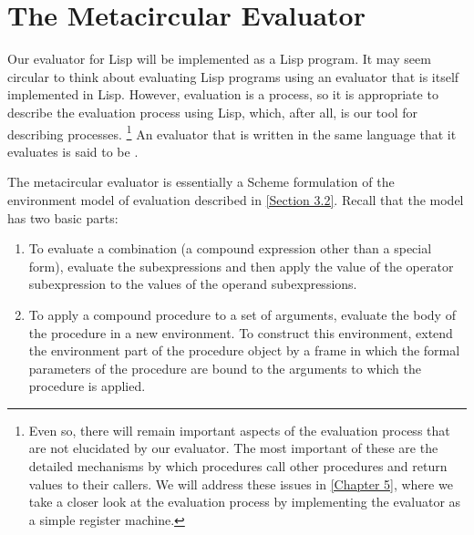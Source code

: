 \section{The Metacircular Evaluator}
\label{Section 4.1}

Our evaluator for Lisp will be implemented as a Lisp program.
It may seem circular to think about evaluating Lisp programs using an evaluator that is itself implemented in Lisp.
However, evaluation is a process, so it is appropriate to describe the evaluation process using Lisp, which, after all, is our tool for describing processes.%
\footnote{
	Even so, there will remain important aspects of the evaluation process that are not elucidated by our evaluator.
	The most important of these are the detailed mechanisms by which procedures call other procedures and return values to their callers.
	We will address these issues in \cref{Chapter 5}, where we take a closer look at the evaluation process by implementing the evaluator as a simple register machine.
}
An evaluator that is written in the same language that it evaluates is said to be .

The metacircular evaluator is essentially a Scheme formulation of the environment model of evaluation described in \cref{Section 3.2}.
Recall that the model has two basic parts:
\begin{enumerate}

	\item
		To evaluate a combination (a compound expression other than a special form), evaluate the subexpressions and then apply the value of the operator subexpression to the values of the operand subexpressions.

	\item
		To apply a compound procedure to a set of arguments, evaluate the body of the procedure in a new environment.
		To construct this environment, extend the environment part of the procedure object by a frame in which the formal parameters of the procedure are bound to the arguments to which the procedure is applied.

\end{enumerate}


